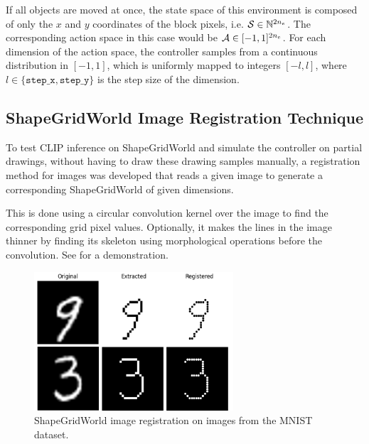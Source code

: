 If all objects are moved at once, the state space of this environment is composed of only the \(x\) and \(y\) coordinates of the block pixels, i.e. \(\mathcal{S} \in \mathbb{N}^{2 n_e}\).
The corresponding action space in this case would be \(\mathcal{A} \in [-1, 1]^{2 n_e}\).
For each dimension of the action space, the controller samples from a continuous distribution in \([-1, 1]\), which is uniformly mapped to integers \([-l, l]\), where \(l \in \{\texttt{step\_x}, \texttt{step\_y}\}\) is the step size of the dimension.

\subsection{ShapeGridWorld Image Registration Technique}
\label{sec:sgw-registration}

To test CLIP inference on ShapeGridWorld and simulate the controller on partial drawings, without having to draw these drawing samples manually, a registration method for images was developed that reads a given image to generate a corresponding ShapeGridWorld of given dimensions.

This is done using a circular convolution kernel over the image to find the corresponding grid pixel values.
Optionally, it makes the lines in the image thinner by finding its skeleton using morphological operations before the convolution.
See  for a demonstration.

\begin{figure}[H]
    \centering
    \includegraphics[width=0.66\textwidth]{images/grid_registration.png}
    \caption{ShapeGridWorld image registration on images from the MNIST dataset.}
    \label{fig:sgw-registration}
\end{figure}

